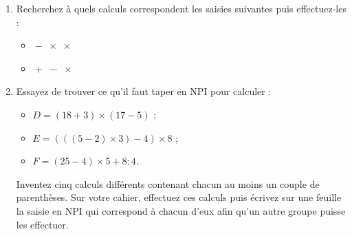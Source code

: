 \begin{TP}

\begin{enumerate}
 \item Recherchez à quels calculs correspondent les saisies suivantes puis effectuez-les :
   \begin{itemize} 
  
  \vspace{1em}
  
  \item {} \quad {} \quad {} \quad {} \quad $\boxed{-}$ \quad {} \quad {} \quad $\boxed{\times}$ \quad {} \quad {} \quad $\boxed{\times}$\\[-0.75em]
  \item {} \quad {} \quad {} \quad {} \quad $\boxed{+}$ \quad {} \quad {} \quad {} \quad {} \quad $\boxed{-}$ \quad $\boxed{\times}$
  \end{itemize}
  
  \vspace{1em}
  
 \item Essayez de trouver ce qu'il faut taper en NPI pour calculer : 
 \begin{itemize}
  \item $D = (18 + 3) \times (17 - 5)$ ;
  \item $E = (((5 - 2) \times 3) - 4) \times 8$ ;
  \item $F = (25 - 4) \times 5 + 8 : 4$.
  \end{itemize}
Inventez cinq calculs différents contenant chacun au moins un couple de parenthèses. Sur votre cahier, effectuez ces calculs puis écrivez sur une feuille la saisie en NPI qui correspond à chacun d'eux afin qu'un autre groupe puisse les effectuer.

 \end{enumerate}
 
\end{TP}

